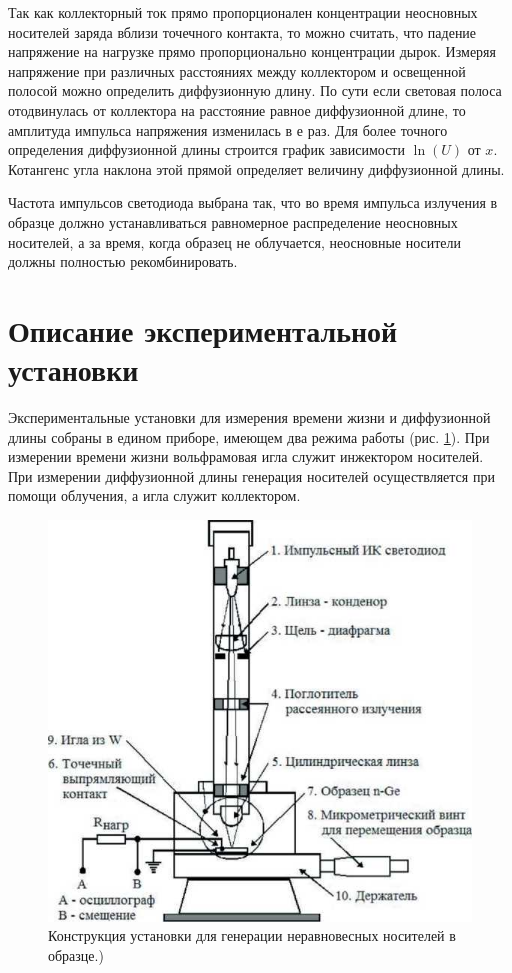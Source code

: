 
Так как коллекторный ток прямо пропорционален концентрации неосновных носителей заряда вблизи точечного контакта, то
можно считать, что падение напряжение на нагрузке прямо пропорционально концентрации дырок. Измеряя напряжение при
различных расстояниях между коллектором и освещенной полосой можно определить диффузионную длину. По сути если световая
полоса отодвинулась от коллектора на расстояние равное диффузионной длине, то амплитуда импульса напряжения изменилась в
$е$ раз. Для более точного определения диффузионной длины строится график зависимости $\ln(U)$ от $x$. Котангенс угла
наклона этой прямой определяет величину диффузионной длины.

Частота импульсов светодиода выбрана так, что во время импульса излучения в образце должно устанавливаться равномерное
распределение неосновных носителей, а за время, когда образец не облучается, неосновные носители должны полностью
рекомбинировать.

\section{Описание экспериментальной установки}

Экспериментальные установки для измерения времени жизни и диффузионной длины собраны в едином приборе, имеющем два режима работы (рис.  \ref{fig:figure13}). При измерении времени жизни вольфрамовая игла служит инжектором носителей. При измерении диффузионной длины генерация носителей осуществляется при помощи облучения, а игла служит коллектором.
\begin{figure}[H]
	\centering
	\includegraphics[width = .5\linewidth]{img/14}
	\caption{Конструкция установки для генерации неравновесных носителей в образце.)
}
	\label{fig:figure13}
\end{figure}


